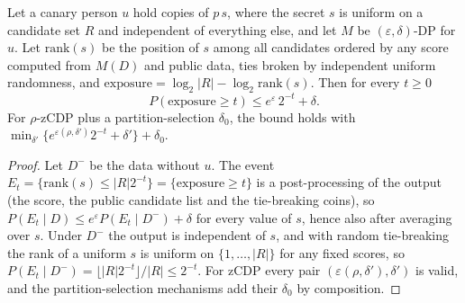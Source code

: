 \begin{proposition}\label{prop:txexposure}
Let a canary person $u$ hold copies of $p\,s$, where the secret $s$ is uniform on a candidate set $R$ and independent
of everything else, and let $M$ be $(\varepsilon,\delta)$-DP for $u$. Let $\mathrm{rank}(s)$ be the position of $s$
among all candidates ordered by any score computed from $M(D)$ and public data, ties broken by independent uniform
randomness, and $\mathrm{exposure}=\log_2|R|-\log_2\mathrm{rank}(s)$. Then for every $t\ge0$
\[P(\mathrm{exposure}\ge t)\le e^{\varepsilon}\,2^{-t}+\delta.\]
For $\rho$-zCDP plus a partition-selection $\delta_0$, the bound holds with
$\min_{\delta'}\{e^{\varepsilon(\rho,\delta')}2^{-t}+\delta'\}+\delta_0$.
\end{proposition}
\begin{proof}
Let $D^-$ be the data without $u$. The event $E_t=\{\mathrm{rank}(s)\le|R|2^{-t}\}=\{\mathrm{exposure}\ge t\}$ is a
post-processing of the output (the score, the public candidate list and the tie-breaking coins), so
$P(E_t\mid D)\le e^\varepsilon P(E_t\mid D^-)+\delta$ for every value of $s$, hence also after averaging over $s$. Under
$D^-$ the output is independent of $s$, and with random tie-breaking the rank of a uniform $s$ is uniform on
$\{1,\dots,|R|\}$ for any fixed scores, so $P(E_t\mid D^-)=\lfloor|R|2^{-t}\rfloor/|R|\le2^{-t}$. For zCDP every pair
$(\varepsilon(\rho,\delta'),\delta')$ is valid, and the partition-selection mechanisms add their $\delta_0$ by
composition.
\end{proof}

